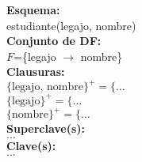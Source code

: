 \documentclass[preview]{standalone}
\begin{document}
\textbf{Esquema:}\\
estudiante(legajo, nombre)\\

\textbf{Conjunto de DF:}\\
$F$=\{legajo $\rightarrow$ nombre\}\\

\textbf{Clausuras:}\\
$\{\text{legajo, nombre}\}^+ = \big\{\dots$\\
$\{\text{legajo}\}^+ = \big\{\dots$\\
$\{\text{nombre}\}^+ = \big\{\dots$\\

\textbf{Superclave(s):}\\
$\dots$\\

\textbf{Clave(s):}\\
$\dots$
\end{document}
